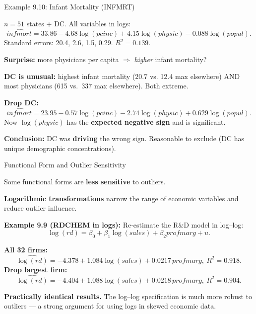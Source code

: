 \documentclass[aspectratio=169, 12pt]{beamer}
\begin{document}
\begin{frame}[shrink=15]{Example 9.10: Infant Mortality (INFMRT)}

  $n = 51$ states + DC. All variables in logs:
  \[
    \widehat{infmort} = 33.86 - 4.68 \log(\mathit{pcinc}) + 4.15 \log(\mathit{physic}) - 0.088 \log(\mathit{popul}).
  \]
  Standard errors: 20.4, 2.6, 1.5, 0.29. $R^2 = 0.139$.

  \medskip
  \textbf{Surprise:} more physicians per capita $\Rightarrow$ \emph{higher} infant mortality?

  \begin{keybox}
    \textbf{DC is unusual:} highest infant mortality (20.7 vs. 12.4 max elsewhere) AND
    most physicians (615 vs.\ 337 max elsewhere). Both extreme.
  \end{keybox}

  \textbf{Drop DC:}
  \[
    \widehat{infmort} = 23.95 - 0.57 \log(\mathit{pcinc}) - 2.74 \log(\mathit{physic}) + 0.629 \log(\mathit{popul}).
  \]
  Now $\log(\mathit{physic})$ has the \textbf{expected negative sign} and is significant.

  \begin{highlightbox}
    \textbf{Conclusion:} DC was \textbf{driving} the wrong sign. Reasonable to exclude (DC
    has unique demographic concentrations).
  \end{highlightbox}

\end{frame}

\begin{frame}[shrink=20]{Functional Form and Outlier Sensitivity}

  Some functional forms are \textbf{less sensitive} to outliers.

  \begin{keybox}
    \textbf{Logarithmic transformations} narrow the range of economic variables and reduce
    outlier influence.

    \medskip
    \textbf{Example 9.9 (RDCHEM in logs):} Re-estimate the R\&D model in log--log:
    \[
      \log(\mathit{rd}) = \beta_0 + \beta_1 \log(\mathit{sales}) + \beta_2 \mathit{profmarg} + u.
    \]
  \end{keybox}

  \textbf{All 32 firms:}
  \[
    \widehat{\log(\mathit{rd})} = -4.378 + 1.084 \log(\mathit{sales}) + 0.0217\,profmarg,\ R^2 = 0.918.
  \]
  \textbf{Drop largest firm:}
  \[
    \widehat{\log(\mathit{rd})} = -4.404 + 1.088 \log(\mathit{sales}) + 0.0218\,profmarg,\ R^2 = 0.904.
  \]

  \begin{highlightbox}
    \textbf{Practically identical results.} The log--log specification is much more robust
    to outliers — a strong argument for using logs in skewed economic data.
  \end{highlightbox}

\end{frame}
\end{document}
